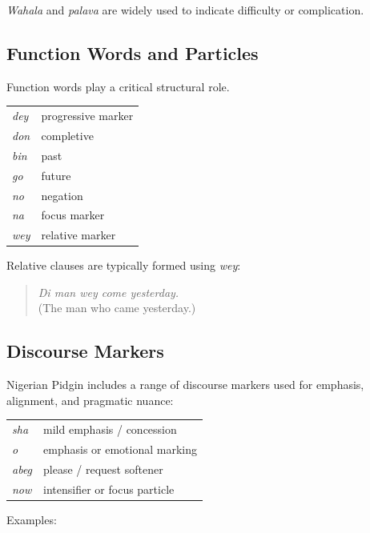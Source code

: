 \documentclass[12pt]{article}
\begin{document}
\textit{Wahala} and \textit{palava} are widely used to indicate difficulty or complication.

\subsection{Function Words and Particles}

Function words play a critical structural role.

\begin{center}
\begin{tabular}{ll}
\textit{dey} & progressive marker \\
\textit{don} & completive \\
\textit{bin} & past \\
\textit{go} & future \\
\textit{no} & negation \\
\textit{na} & focus marker \\
\textit{wey} & relative marker \\
\end{tabular}
\end{center}

Relative clauses are typically formed using \textit{wey}:

\begin{quote}
\textit{Di man wey come yesterday.} \\
(The man who came yesterday.)
\end{quote}

\subsection{Discourse Markers}

Nigerian Pidgin includes a range of discourse markers used for emphasis, alignment, and pragmatic nuance:

\begin{center}
\begin{tabular}{ll}
\textit{sha} & mild emphasis / concession \\
\textit{o} & emphasis or emotional marking \\
\textit{abeg} & please / request softener \\
\textit{now} & intensifier or focus particle \\
\end{tabular}
\end{center}

Examples:
\end{document}
